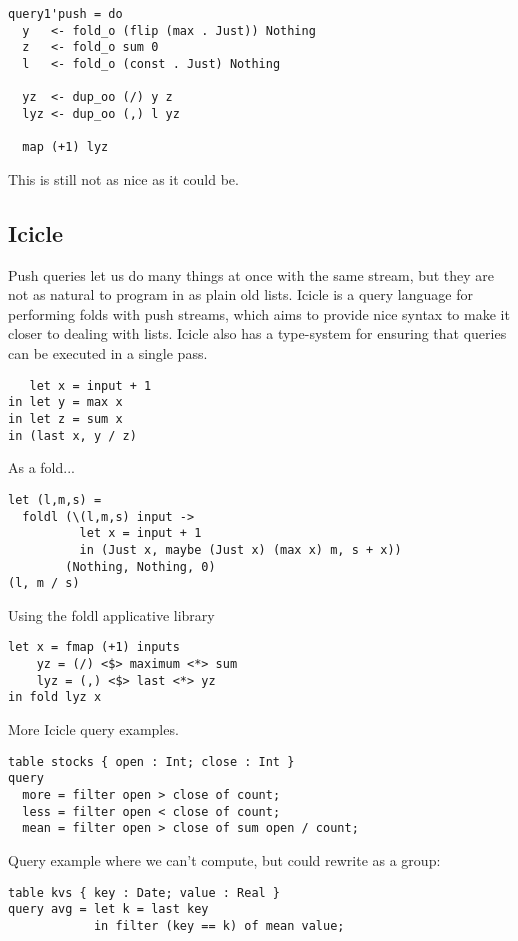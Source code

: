 \begin{lstlisting}
query1'push = do
  y   <- fold_o (flip (max . Just)) Nothing
  z   <- fold_o sum 0
  l   <- fold_o (const . Just) Nothing

  yz  <- dup_oo (/) y z
  lyz <- dup_oo (,) l yz

  map (+1) lyz
\end{lstlisting}


This is still not as nice as it could be.

\subsection{Icicle}

Push queries let us do many things at once with the same stream, but they are not as natural to program in as plain old lists.
Icicle is a query language for performing folds with push streams, which aims to provide nice syntax to make it closer to dealing with lists.
Icicle also has a type-system for ensuring that queries can be executed in a single pass.

\begin{lstlisting}
   let x = input + 1
in let y = max x
in let z = sum x
in (last x, y / z)
\end{lstlisting}

As a fold...
\begin{lstlisting}
let (l,m,s) =
  foldl (\(l,m,s) input ->
          let x = input + 1
          in (Just x, maybe (Just x) (max x) m, s + x))
        (Nothing, Nothing, 0)
(l, m / s)
\end{lstlisting}

Using the foldl applicative library
\begin{lstlisting}
let x = fmap (+1) inputs
    yz = (/) <$> maximum <*> sum
    lyz = (,) <$> last <*> yz
in fold lyz x
\end{lstlisting}

More Icicle query examples.
\begin{lstlisting}
table stocks { open : Int; close : Int }
query
  more = filter open > close of count;
  less = filter open < close of count;
  mean = filter open > close of sum open / count;
\end{lstlisting}

Query example where we can't compute, but could rewrite as a group:
\begin{lstlisting}
table kvs { key : Date; value : Real }
query avg = let k = last key
            in filter (key == k) of mean value;
\end{lstlisting}


